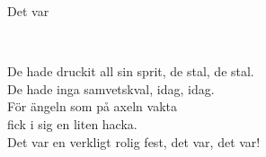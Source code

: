 \begin{song}{Det var}
	
	
	\\
	
	De hade druckit all sin sprit, de stal, de stal.\\
	De hade inga samvetskval, idag, idag.\\
	För ängeln som på axeln vakta\\
	fick i sig en liten hacka.\\
	Det var en verkligt rolig fest, det var, det var!
	
\end{song}
